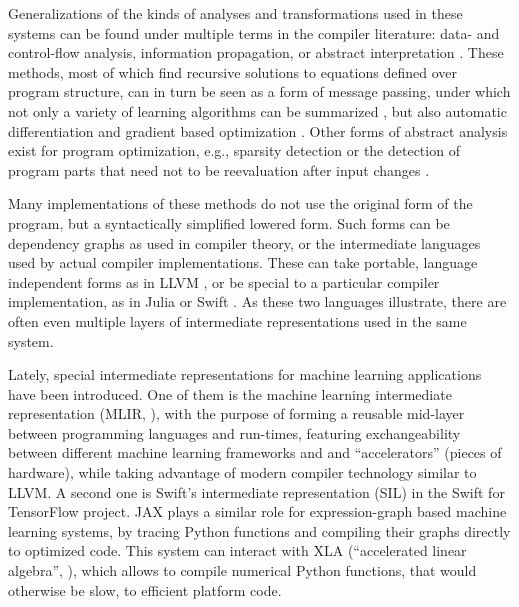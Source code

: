 Generalizations of the kinds of analyses and transformations used in these systems can be found
under multiple terms in the compiler literature: data- and control-flow analysis, information
propagation, or abstract interpretation \parencite{muchnick1997advanced,singer2018static}.  These
methods, most of which find recursive solutions to equations defined over program structure, can in
turn be seen as a form of message passing, under which not only a variety of learning algorithms can
be summarized \parencite{minka2005divergence}, but also automatic differentiation
\parencite{minka2019automatic} and gradient based optimization \parencite{dauwels2005steepest}.
Other forms of abstract analysis exist for program optimization, e.g., sparsity detection
\parencite{gowda2019sparsity} or the detection of program parts that need not to be reevaluation
after input changes \parencite{becker2020dynamic}.

Many implementations of these methods do not use the original form of the program, but a
syntactically simplified lowered form.  Such forms can be dependency graphs as used in compiler
theory, or the intermediate languages used by actual compiler implementations.  These can take
portable, language independent forms as in LLVM \parencite{llvmproject2019llvm}, or be special to a
particular compiler implementation, as in Julia \parencite{bezanson2017julia} or Swift
\parencite{apple2020swifta}.  As these two languages illustrate, there are often even multiple
layers of intermediate representations used in the same system.

Lately, special intermediate representations for machine learning applications have been introduced.
One of them is the machine learning intermediate representation (MLIR, \textcite{lattner2020mlir}),
with the purpose of forming a reusable mid-layer between programming languages and run-times,
featuring exchangeability between different machine learning frameworks and and
\enquote{accelerators} (pieces of hardware), while taking advantage of modern compiler technology
similar to LLVM.  A second one is Swift's intermediate representation (SIL) in the Swift for
TensorFlow project.  JAX \parencite{bradbury2018jax} plays a similar role for expression-graph based
machine learning systems, by tracing Python functions and compiling their graphs directly to
optimized code.  This system can interact with XLA (\enquote{accelerated linear algebra},
\textcite{tensorflowdevelopers2020xla}), which allows to compile numerical Python functions, that
would otherwise be slow, to efficient platform code.

